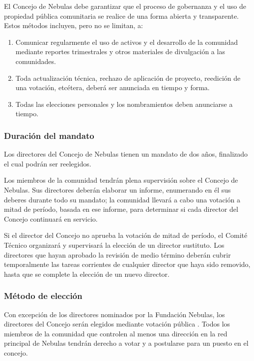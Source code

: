 El Concejo de Nebulas debe garantizar que el proceso de gobernanza y el uso de propiedad pública comunitaria se realice de una forma abierta y transparente. Estos métodos incluyen, pero no se limitan, a:

\begin{enumerate}
	\item Comunicar regularmente el uso de activos y el desarrollo de la comunidad mediante reportes trimestrales y otros materiales de divulgación a las comunidades.
	\item Toda actualización técnica, rechazo de aplicación de proyecto, reedición de una votación, etcétera, deberá ser anunciada en tiempo y forma.
	\item Todas las elecciones personales y los nombramientos deben anunciarse a tiempo.
\end{enumerate}

\subsubsection{Duración del mandato}

Los directores del Concejo de Nebulas tienen un mandato de dos años, finalizado el cual podrán ser reelegidos.

\vspace{2em}

Los miembros de la comunidad tendrán plena supervisión sobre el Concejo de Nebulas. Sus directores  deberán elaborar un informe, enumerando en él sus deberes durante todo su mandato; la comunidad llevará a cabo una votación a mitad de período, basada en ese informe, para determinar si cada director del Concejo continuará en servicio.

Si el director del Concejo no aprueba la votación de mitad de período, el Comité Técnico organizará y supervisará la elección de un director sustituto. Los directores que hayan aprobado la revisión de medio término deberán cubrir temporalmente las tareas corrientes de cualquier director que haya sido removido, hasta que se complete la elección de un nuevo director.

\subsubsection{Método de elección}

Con excepción de los directores nominados por la Fundación Nebulas, los directores del Concejo serán elegidos mediante votación pública \onchain. Todos los miembros de la comunidad que controlen al menos una dirección en la red principal de Nebulas tendrán derecho a votar y a postularse para un puesto en el concejo.


